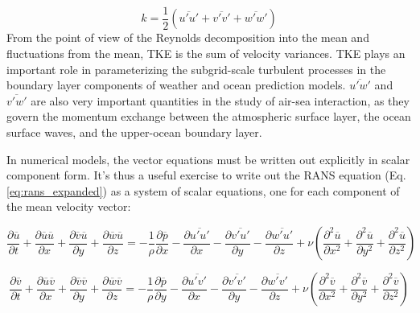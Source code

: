 \documentclass[12pt]{article}
\numberwithin{equation}{section}
\numberwithin{figure}{section}
\numberwithin{table}{section}
\begin{document}
\begin{equation}
  k = \frac{1}{2} \left( \overline{u'u'} + \overline{v'v'} + \overline{w'w'} \right)
\end{equation}
From the point of view of the Reynolds decomposition into the mean and
fluctuations from the mean, TKE is the sum of velocity variances.
TKE plays an important role in parameterizing the subgrid-scale turbulent
processes in the boundary layer components of weather and ocean prediction
models.
$\overline{u'w'}$ and $\overline{v'w'}$ are also very important quantities in
the study of air-sea interaction, as they govern the momentum exchange between
the atmospheric surface layer, the ocean surface waves, and the upper-ocean
boundary layer.

In numerical models, the vector equations must be written out explicitly in
scalar component form.
It's thus a useful exercise to write out the RANS equation
(Eq. \ref{eq:rans_expanded}) as a system of scalar equations, one for each
component of the mean velocity vector:

\begin{equation}
  \frac{\partial \overline{u}}{\partial t} + 
  \frac{\partial \overline{u} \overline{u}}{\partial x} +
  \frac{\partial \overline{v} \overline{u}}{\partial y} +
  \frac{\partial \overline{w} \overline{u}}{\partial z} =
  - \frac{1}{\rho} \frac{\partial \overline{p}}{\partial x}
  - \frac{\partial \overline{u'u'}}{\partial x} - \frac{\partial \overline{v'u'}}{\partial y} - \frac{\partial \overline{w'u'}}{\partial z}
  + \nu \left( \frac{\partial^2 \overline{u}}{\partial x^2} + 
               \frac{\partial^2 \overline{u}}{\partial y^2} +
               \frac{\partial^2 \overline{u}}{\partial z^2}
        \right)
\end{equation}

\begin{equation}
  \frac{\partial \overline{v}}{\partial t} + 
  \frac{\partial \overline{u} \overline{v}}{\partial x} +
  \frac{\partial \overline{v} \overline{v}}{\partial y} +
  \frac{\partial \overline{w} \overline{v}}{\partial z} =
  - \frac{1}{\rho} \frac{\partial \overline{p}}{\partial y}
  - \frac{\partial \overline{u'v'}}{\partial x} - \frac{\partial \overline{v'v'}}{\partial y} - \frac{\partial \overline{w'v'}}{\partial z}
  + \nu \left( \frac{\partial^2 \overline{v}}{\partial x^2} + 
               \frac{\partial^2 \overline{v}}{\partial y^2} +
               \frac{\partial^2 \overline{v}}{\partial z^2}
        \right)
\end{equation}
\end{document}
